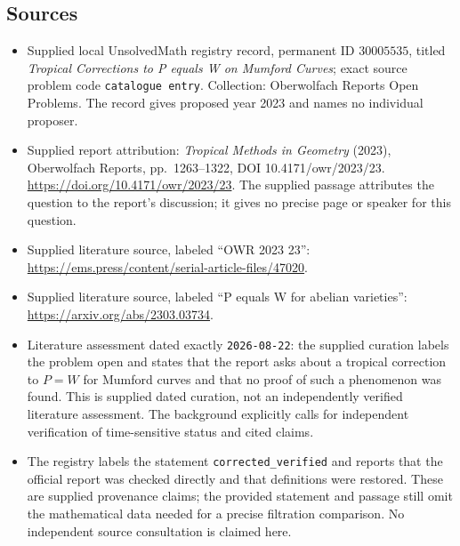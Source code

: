 \documentclass[11pt]{article}
\begin{document}
\subsection{Sources}
\begin{itemize}
\item Supplied local UnsolvedMath registry record, permanent ID \(30005535\), titled \emph{Tropical Corrections to P equals W on Mumford Curves}; exact source problem code \texttt{catalogue entry}. Collection: Oberwolfach Reports Open Problems. The record gives proposed year 2023 and names no individual proposer.
\item Supplied report attribution: \emph{Tropical Methods in Geometry} (2023), Oberwolfach Reports, pp.\ 1263--1322, DOI 10.4171/owr/2023/23. \url{https://doi.org/10.4171/owr/2023/23}. The supplied passage attributes the question to the report's discussion; it gives no precise page or speaker for this question.
\item Supplied literature source, labeled ``OWR 2023 23'': \url{https://ems.press/content/serial-article-files/47020}.
\item Supplied literature source, labeled ``P equals W for abelian varieties'': \url{https://arxiv.org/abs/2303.03734}.
\item Literature assessment dated exactly \texttt{2026-08-22}: the supplied curation labels the problem open and states that the report asks about a tropical correction to \(P=W\) for Mumford curves and that no proof of such a phenomenon was found. This is supplied dated curation, not an independently verified literature assessment. The background explicitly calls for independent verification of time-sensitive status and cited claims.
\item The registry labels the statement \texttt{corrected\_verified} and reports that the official report was checked directly and that definitions were restored. These are supplied provenance claims; the provided statement and passage still omit the mathematical data needed for a precise filtration comparison. No independent source consultation is claimed here.
\end{itemize}
\end{document}
